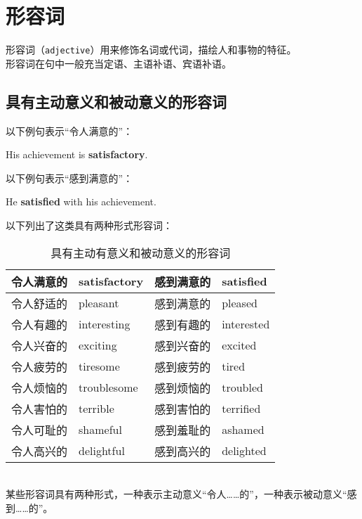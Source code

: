\documentclass[UTF8]{ctexart}
\begin{document}
\newpage

\section{形容词}
    形容词（\texttt{adjective}）用来修饰名词或代词，描绘人和事物的特征。\\[3mm]
    形容词在句中一般充当定语、主语补语、宾语补语。\vspace{3pt}

\subsection{具有主动意义和被动意义的形容词}
    以下例句表示“令人满意的”：
    \begin{center}
        \large\ttfamily
        His achievement is \textbf{satisfactory}.\\[6mm]
    \end{center}
    以下例句表示“感到满意的”：
    \begin{center}
        \large\ttfamily
        He \textbf{satisfied} with his achievement.\\[6mm]
    \end{center}
    以下列出了这类具有两种形式形容词：\vspace{3pt}
    \begin{table}[h]
        \begin{center}
            \ttfamily
            \begin{tabular}{p{80pt}|p{80pt}|p{80pt}|p{80pt}}
                \hline
                令人满意的&satisfactory&感到满意的&satisfied\\ \hline
                令人舒适的&pleasant&感到满意的&pleased\\\hline
                令人有趣的&interesting&感到有趣的&interested\\ \hline
                令人兴奋的&exciting&感到兴奋的&excited\\ \hline
                令人疲劳的&tiresome&感到疲劳的&tired\\ \hline
                令人烦恼的&troublesome&感到烦恼的&troubled\\ \hline
                令人害怕的&terrible&感到害怕的&terrified\\ \hline
                令人可耻的&shameful&感到羞耻的&ashamed\\ \hline
                令人高兴的&delightful&感到高兴的&delighted\\ \hline
            \end{tabular}
            \rmfamily
            \caption{具有主动有意义和被动意义的形容词}
        \end{center}
    \end{table}\\
    某些形容词具有两种形式，一种表示主动意义“令人……的”，一种表示被动意义“感到……的”。\\
\end{document}
